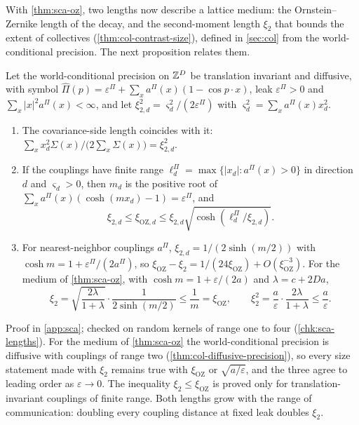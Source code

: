 With \cref{thm:sca-oz}, two lengths now describe a lattice medium: the Ornstein--Zernike length of the decay, and the second-moment length $\xi_2$ that bounds the extent of collectives (\cref{thm:col-contrast-size}), defined in \cref{sec:col} from the world-conditional precision. The next proposition relates them.

\begin{proposition}\label{prop:sca-lengths-relation}
Let the world-conditional precision on $\mathbb{Z}^D$ be translation invariant and diffusive, with symbol $\hat\Pi(p)=\varepsilon^\Pi+\sum_xa^\Pi(x)(1-\cos p\cdot x)$, leak $\varepsilon^\Pi>0$ and $\sum_x|x|^2a^\Pi(x)<\infty$, and let $\xi_{2,d}^2=\varsigma_d^2/(2\varepsilon^\Pi)$ with $\varsigma_d^2=\sum_xa^\Pi(x)x_d^2$.
\begin{enumerate}
\item[(a)] The covariance-side length coincides with it: $\sum_xx_d^2\Sigma(x)/\bigl(2\sum_x\Sigma(x)\bigr)=\xi_{2,d}^2$.
\item[(b)] If the couplings have finite range $\ell^\Pi_d=\max\{|x_d|:a^\Pi(x)>0\}$ in direction $d$ and $\varsigma_d>0$, then $m_d$ is the positive root of $\sum_xa^\Pi(x)(\cosh(mx_d)-1)=\varepsilon^\Pi$, and
\begin{equation}\label{eq:sca-lengths-bracket}
\xi_{2,d}\le\xi_{\mathrm{OZ},d}\le\xi_{2,d}\sqrt{\cosh(\ell^\Pi_d/\xi_{2,d})}.
\end{equation}
\item[(c)] For nearest-neighbor couplings $a^\Pi$, $\xi_{2,d}=1/(2\sinh(m/2))$ with $\cosh m=1+\varepsilon^\Pi/(2a^\Pi)$, so $\xi_{\mathrm{OZ}}-\xi_2=1/(24\xi_{\mathrm{OZ}})+O(\xi_{\mathrm{OZ}}^{-3})$. For the medium of \cref{thm:sca-oz}, with $\cosh m=1+\varepsilon/(2a)$ and $\lambda=c+2Da$,
\begin{equation}\label{eq:sca-lengths-r3}
\xi_2=\sqrt{\frac{2\lambda}{1+\lambda}}\cdot\frac{1}{2\sinh(m/2)}\le\frac1m=\xi_{\mathrm{OZ}},\qquad\xi_2^2=\frac a\varepsilon\cdot\frac{2\lambda}{1+\lambda}\le\frac a\varepsilon.
\end{equation}
\end{enumerate}
\end{proposition}
Proof in \cref{app:sca}; checked on random kernels of range one to four (\cref{chk:sca-lengths}). For the medium of \cref{thm:sca-oz} the world-conditional precision is diffusive with couplings of range two (\cref{thm:col-diffusive-precision}), so every size statement made with $\xi_2$ remains true with $\xi_{\mathrm{OZ}}$ or $\sqrt{a/\varepsilon}$, and the three agree to leading order as $\varepsilon\to0$. The inequality $\xi_2\le\xi_{\mathrm{OZ}}$ is proved only for translation-invariant couplings of finite range. Both lengths grow with the range of communication: doubling every coupling distance at fixed leak doubles $\xi_2$.

